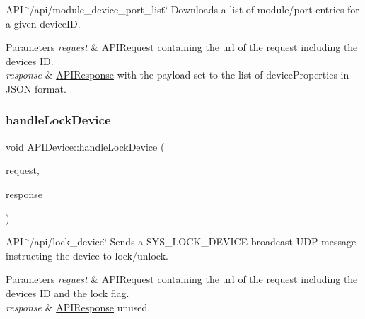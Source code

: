 A\+PI \char`\"{}/api/module\+\_\+device\+\_\+port\+\_\+list\char`\"{} Downloads a list of module/port entries for a given device\+ID. 
\begin{DoxyParams}{Parameters}
{\em request} & \hyperlink{class_a_p_i_request}{A\+P\+I\+Request} containing the url of the request including the device\textquotesingle{}s ID. \\
\hline
{\em response} & \hyperlink{class_a_p_i_response}{A\+P\+I\+Response} with the payload set to the list of device\+Properties in J\+S\+ON format. \\
\hline
\end{DoxyParams}
\mbox{\label{class_a_p_i_device_a9fa95a9f88e738477ed5e32e22ae6990}} 
\subsubsection{\texorpdfstring{handle\+Lock\+Device}{handleLockDevice}}
{\footnotesize\ttfamily void A\+P\+I\+Device\+::handle\+Lock\+Device (\begin{DoxyParamCaption}\item[{const \hyperlink{class_a_p_i_request}{A\+P\+I\+Request} \&}]{request,  }\item[{\hyperlink{class_a_p_i_response}{A\+P\+I\+Response} $\ast$}]{response }\end{DoxyParamCaption})\hspace{0.3cm}{\ttfamily [slot]}}

A\+PI \char`\"{}/api/lock\+\_\+device\char`\"{} Sends a S\+Y\+S\+\_\+\+L\+O\+C\+K\+\_\+\+D\+E\+V\+I\+CE broadcast U\+DP message instructing the device to lock/unlock. 
\begin{DoxyParams}{Parameters}
{\em request} & \hyperlink{class_a_p_i_request}{A\+P\+I\+Request} containing the url of the request including the device\textquotesingle{}s ID and the lock flag. \\
\hline
{\em response} & \hyperlink{class_a_p_i_response}{A\+P\+I\+Response} unused. \\
\hline
\end{DoxyParams}
\mbox{\label{class_a_p_i_device_a794458df71d6f24a8b8dccbbdf9235da}} 

